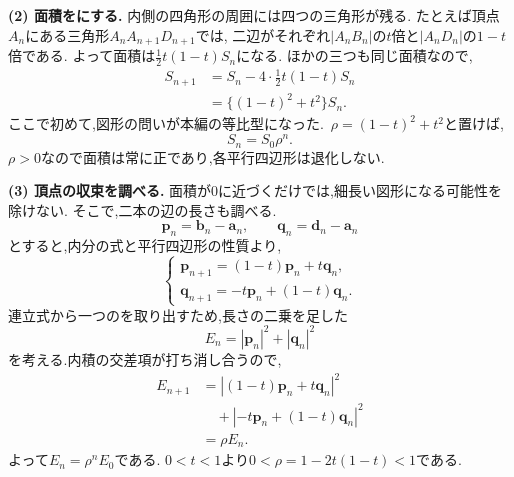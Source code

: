 \begin{enumerate}[label=\textbf{問\arabic*.},leftmargin=3.8em,format=\bookitemlink{practice-entrance}{solution}{problem}]
                \textbf{(2) 面積をにする.}
                内側の四角形の周囲には四つの三角形が残る.
                たとえば頂点$A_n$にある三角形$A_nA_{n+1}D_{n+1}$では,
                二辺がそれぞれ$|A_nB_n|$の$t$倍と$|A_nD_n|$の$1-t$倍である.
                よって面積は$\frac12t(1-t)S_n$になる.
                ほかの三つも同じ面積なので,
                \[
                 \begin{aligned}
                 S_{n+1}
                 &=S_n-4\cdot\frac12t(1-t)S_n\\
                 &=\{(1-t)^2+t^2\}S_n.
                 \end{aligned}
                \]
                ここで初めて,図形の問いが本編の等比型になった.
                \,$\rho=(1-t)^2+t^2$と置けば,
                \[
                 S_n=S_0\rho^n.
                \]
                $\rho>0$なので面積は常に正であり,各平行四辺形は退化しない.
                \par\noindent
                \textbf{(3) 頂点の収束を調べる.}
                面積が$0$に近づくだけでは,細長い図形になる可能性を除けない.
                そこで,二本の辺の長さも調べる.
                \[
                 \boldsymbol p_n=\boldsymbol b_n-\boldsymbol a_n,
                 \qquad
                 \boldsymbol q_n=\boldsymbol d_n-\boldsymbol a_n
                \]
                とすると,内分の式と平行四辺形の性質より,
                \[
                 \begin{cases}
                 \boldsymbol p_{n+1}=(1-t)\boldsymbol p_n+t\boldsymbol q_n,\\
                 \boldsymbol q_{n+1}=-t\boldsymbol p_n+(1-t)\boldsymbol q_n.
                 \end{cases}
                \]
                連立式から一つのを取り出すため,長さの二乗を足した
                \[
                 E_n=|\boldsymbol p_n|^2+|\boldsymbol q_n|^2
                \]
                を考える.内積の交差項が打ち消し合うので,
                \[
                 \begin{aligned}
                 E_{n+1}
                 &=|(1-t)\boldsymbol p_n+t\boldsymbol q_n|^2\\
                 &\quad+|-t\boldsymbol p_n+(1-t)\boldsymbol q_n|^2\\
                 &=\rho E_n.
                 \end{aligned}
                \]
                よって$E_n=\rho^nE_0$である.
                $0<t<1$より$0<\rho=1-2t(1-t)<1$である.

\end{enumerate}
